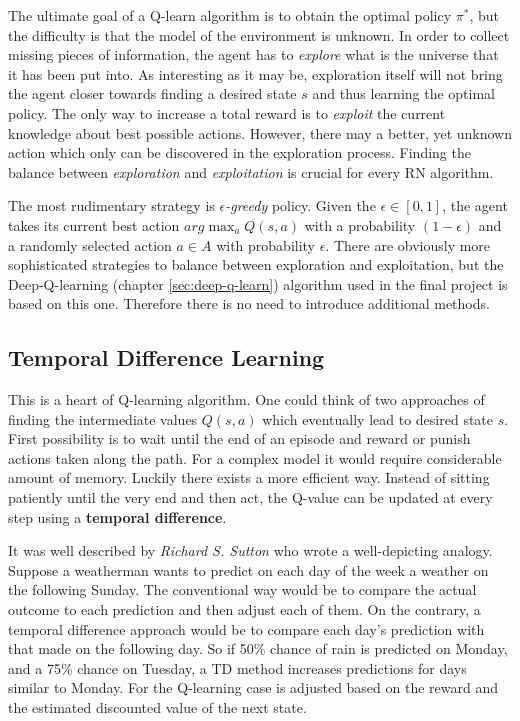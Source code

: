 The ultimate goal of a Q-learn algorithm is to obtain the optimal policy $\pi^{*}$, but the difficulty is that the model of the environment is unknown. In order to collect missing pieces of information, the agent has to \emph{explore} what is the universe that it has been put into. As interesting as it may be, exploration itself will not bring the agent closer towards finding a desired state $s$ and thus learning the optimal policy. The only way to increase a total reward is to \emph{exploit} the current knowledge about best possible actions. However, there may a better, yet unknown action which only can be discovered in the exploration process. Finding the balance between \emph{exploration} and \emph{exploitation} is crucial for every RN algorithm.

The most rudimentary strategy is \emph{$\epsilon$-greedy} policy. Given the $\epsilon \in [0, 1]$, the agent takes its current best action $arg\max_a Q(s, a)$ with a probability $(1 - \epsilon)$ and a randomly selected action $a \in A$ with probability $\epsilon$. There are obviously more sophisticated strategies to balance between exploration and exploitation, but the Deep-Q-learning (chapter \ref{sec:deep-q-learn}) algorithm used in the final project is based on this one. Therefore there is no need to introduce additional methods.

\subsection{Temporal Difference Learning}
\label{sub:temporal-difference-learning}

This is a heart of Q-learning algorithm. One could think of two approaches of finding the intermediate values $Q(s, a)$ which eventually lead to desired state $s$. First possibility is to wait until the end of an episode and reward or punish actions taken along the path. For a complex model it would require considerable amount of memory. Luckily there exists a more efficient way. Instead of sitting patiently until the very end and then act, the Q-value can be updated at every step using a \textbf{temporal difference}.

It was well described by \emph {Richard S. Sutton} \cite{SuttonTD} who wrote a well-depicting analogy. Suppose a weatherman wants to predict on each day of the week a weather on the following Sunday. The conventional way would be to compare the actual outcome to each prediction and then adjust each of them. On the contrary, a temporal difference approach would be to compare each day's prediction with that made on the following day. So if 50\% chance of rain is predicted on Monday, and a 75\% chance on Tuesday, a TD method increases predictions for days similar to Monday. For the Q-learning case is adjusted based on the reward and the estimated discounted value of the next state.

